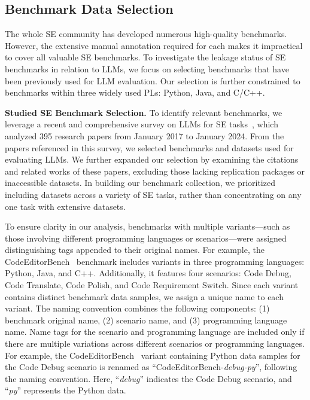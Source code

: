 \vspace{-0.2cm}
 \subsection{Benchmark Data Selection}
 \label{benchmark_selection}


The whole SE community has developed numerous high-quality benchmarks. However, the extensive manual annotation required for each makes it impractical to cover all valuable SE benchmarks. To investigate the leakage status of SE benchmarks in relation to LLMs, we focus on selecting benchmarks that have been previously used for LLM evaluation. Our selection is further constrained to benchmarks within three widely used PLs: Python, Java, and C/C++.



\vspace{0.1cm}
\noindent
\textbf{Studied SE Benchmark Selection.} 
To identify relevant benchmarks, we leverage a recent and comprehensive survey on LLMs for SE tasks~\cite{hou2024large}, which analyzed 395 research papers from January 2017 to January 2024. 
From the papers referenced in this survey, we selected benchmarks and datasets used for evaluating LLMs. We further expanded our selection by examining the citations and related works of these papers, excluding those lacking replication packages or inaccessible datasets.
In building our benchmark collection, we prioritized including datasets across a variety of SE tasks, rather than concentrating on any one task with extensive datasets. 



To ensure clarity in our analysis, benchmarks with multiple variants—such as those involving different programming languages or scenarios—were assigned distinguishing tags appended to their original names.
For example, the CodeEditorBench~\cite{CodeEditorBench} benchmark includes variants in three programming languages: Python, Java, and C++. Additionally, it features four scenarios: Code Debug, Code Translate, Code Polish, and Code Requirement Switch. Since each variant contains distinct benchmark data samples, we assign a unique name to each variant.
The naming convention combines the following components:
(1) benchmark original name, (2) scenario name, and (3) programming language name. Name tags for the scenario and programming language are included only if there are multiple variations across different scenarios or programming languages.
For example, the CodeEditorBench~\cite{CodeEditorBench} variant containing Python data samples for the Code Debug scenario is renamed as ``CodeEditorBench-\textit{debug-py}'', following the naming convention. Here, ``\textit{debug}'' indicates the Code Debug scenario, and ``\textit{py}'' represents the Python data.




